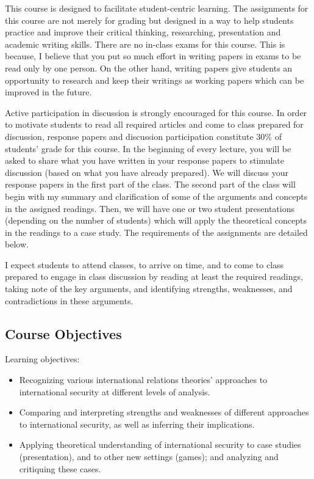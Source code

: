 \documentclass[
  letterpaper,
  DIV=11,
  numbers=noendperiod]{scrartcl}
\providecommand{\tightlist}{%
  \setlength{\itemsep}{0pt}\setlength{\parskip}{0pt}}\usepackage{longtable,booktabs,array}
\begin{document}
This course is designed to facilitate student-centric learning. The
assignments for this course are not merely for grading but designed in a
way to help students practice and improve their critical thinking,
researching, presentation and academic writing skills. There are no
in-class exams for this course. This is because, I believe that you put
so much effort in writing papers in exams to be read only by one person.
On the other hand, writing papers give students an opportunity to
research and keep their writings as working papers which can be improved
in the future.

Active participation in discussion is strongly encouraged for this
course. In order to motivate students to read all required articles and
come to class prepared for discussion, response papers and discussion
participation constitute 30\% of students' grade for this course. In the
beginning of every lecture, you will be asked to share what you have
written in your response papers to stimulate discussion (based on what
you have already prepared). We will discuss your response papers in the
first part of the class. The second part of the class will begin with my
summary and clarification of some of the arguments and concepts in the
assigned readings. Then, we will have one or two student presentations
(depending on the number of students) which will apply the theoretical
concepts in the readings to a case study. The requirements of the
assignments are detailed below.

I expect students to attend classes, to arrive on time, and to come to
class prepared to engage in class discussion by reading at least the
required readings, taking note of the key arguments, and identifying
strengths, weaknesses, and contradictions in these arguments.

\hypertarget{course-objectives}{%
\subsection{\texorpdfstring{\textbf{Course
Objectives}}{Course Objectives}}\label{course-objectives}}

Learning objectives:

\begin{itemize}
\tightlist
\item
  Recognizing various international relations theories' approaches to
  international security at different levels of analysis.
\item
  Comparing and interpreting strengths and weaknesses of different
  approaches to international security, as well as inferring their
  implications.
\item
  Applying theoretical understanding of international security to case
  studies (presentation), and to other new settings (games); and
  analyzing and critiquing these cases.
\end{itemize}
\end{document}
